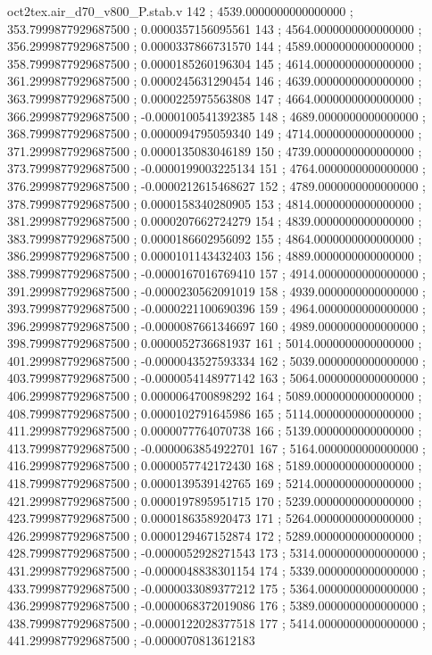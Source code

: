 \begin{filecontents}[overwrite]{oct2tex.air_d70_v800_P.stab.v}
142 ; 4539.0000000000000000 ; 353.7999877929687500 ; 0.0000357156095561
143 ; 4564.0000000000000000 ; 356.2999877929687500 ; 0.0000337866731570
144 ; 4589.0000000000000000 ; 358.7999877929687500 ; 0.0000185260196304
145 ; 4614.0000000000000000 ; 361.2999877929687500 ; 0.0000245631290454
146 ; 4639.0000000000000000 ; 363.7999877929687500 ; 0.0000225975563808
147 ; 4664.0000000000000000 ; 366.2999877929687500 ; -0.0000100541392385
148 ; 4689.0000000000000000 ; 368.7999877929687500 ; 0.0000094795059340
149 ; 4714.0000000000000000 ; 371.2999877929687500 ; 0.0000135083046189
150 ; 4739.0000000000000000 ; 373.7999877929687500 ; -0.0000199003225134
151 ; 4764.0000000000000000 ; 376.2999877929687500 ; -0.0000212615468627
152 ; 4789.0000000000000000 ; 378.7999877929687500 ; 0.0000158340280905
153 ; 4814.0000000000000000 ; 381.2999877929687500 ; 0.0000207662724279
154 ; 4839.0000000000000000 ; 383.7999877929687500 ; 0.0000186602956092
155 ; 4864.0000000000000000 ; 386.2999877929687500 ; 0.0000101143432403
156 ; 4889.0000000000000000 ; 388.7999877929687500 ; -0.0000167016769410
157 ; 4914.0000000000000000 ; 391.2999877929687500 ; -0.0000230562091019
158 ; 4939.0000000000000000 ; 393.7999877929687500 ; -0.0000221100690396
159 ; 4964.0000000000000000 ; 396.2999877929687500 ; -0.0000087661346697
160 ; 4989.0000000000000000 ; 398.7999877929687500 ; 0.0000052736681937
161 ; 5014.0000000000000000 ; 401.2999877929687500 ; -0.0000043527593334
162 ; 5039.0000000000000000 ; 403.7999877929687500 ; -0.0000054148977142
163 ; 5064.0000000000000000 ; 406.2999877929687500 ; 0.0000064700898292
164 ; 5089.0000000000000000 ; 408.7999877929687500 ; 0.0000102791645986
165 ; 5114.0000000000000000 ; 411.2999877929687500 ; 0.0000077764070738
166 ; 5139.0000000000000000 ; 413.7999877929687500 ; -0.0000063854922701
167 ; 5164.0000000000000000 ; 416.2999877929687500 ; 0.0000057742172430
168 ; 5189.0000000000000000 ; 418.7999877929687500 ; 0.0000139539142765
169 ; 5214.0000000000000000 ; 421.2999877929687500 ; 0.0000197895951715
170 ; 5239.0000000000000000 ; 423.7999877929687500 ; 0.0000186358920473
171 ; 5264.0000000000000000 ; 426.2999877929687500 ; 0.0000129467152874
172 ; 5289.0000000000000000 ; 428.7999877929687500 ; -0.0000052928271543
173 ; 5314.0000000000000000 ; 431.2999877929687500 ; -0.0000048838301154
174 ; 5339.0000000000000000 ; 433.7999877929687500 ; -0.0000033089377212
175 ; 5364.0000000000000000 ; 436.2999877929687500 ; -0.0000068372019086
176 ; 5389.0000000000000000 ; 438.7999877929687500 ; -0.0000122028377518
177 ; 5414.0000000000000000 ; 441.2999877929687500 ; -0.0000070813612183

\end{filecontents}
